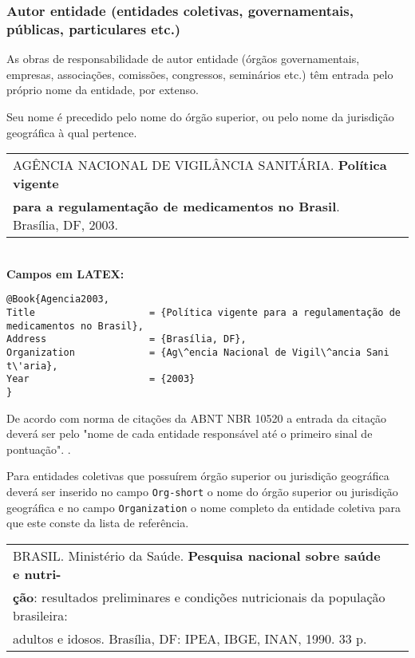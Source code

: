 \subsubsection{Autor entidade (entidades coletivas, governamentais, públicas, particulares etc.) }
	
As obras de responsabilidade de autor entidade (órgãos governamentais, empresas, associações, comissões, congressos,
seminários etc.) têm entrada pelo próprio nome da entidade, por extenso.
	
Seu nome é precedido pelo nome do órgão superior, ou pelo nome da jurisdição geográfica à qual pertence.  
	
\begin{tabular}{|l|c|} \hline
	AGÊNCIA NACIONAL DE VIGILÂNCIA SANITÁRIA. \textbf{Política vigente}          \\ 
	\textbf{para a regulamentação de medicamentos no Brasil}. Brasília, DF, 2003. \\\hline
\end{tabular}\\
	
\textbf{Campos em LATEX:} 
	
\begingroup
\fontsize{10pt}{12pt}\selectfont
\begin{verbatim}
@Book{Agencia2003,
Title                    = {Política vigente para a regulamentação de 
medicamentos no Brasil},
Address                  = {Brasília, DF},
Organization             = {Ag\^encia Nacional de Vigil\^ancia Sani
t\'aria},
Year                     = {2003}
}
\end{verbatim}
\endgroup
	
De acordo com norma de citações da ABNT NBR 10520 a entrada da citação deverá ser pelo "nome de cada entidade responsável até o primeiro sinal de pontuação". \cite{NBR10520:2002}. 
	
Para entidades coletivas que possuírem órgão superior ou jurisdição geográfica deverá ser inserido no campo \texttt{Org-short} o nome do órgão superior  ou jurisdição geográfica e no campo \texttt{Organization} o nome completo da entidade coletiva para que este conste da lista de referência. \\
	
\begin{tabular}{|l|c|} \hline
	BRASIL. Ministério da Saúde. \textbf{Pesquisa nacional sobre saúde e nutri-} \\ \textbf{ção}: resultados preliminares e condições nutricionais da população brasileira: \\ adultos e idosos. Brasília, DF: IPEA, IBGE, INAN, 1990. 33 p.   \\\hline
\end{tabular}\\
	
